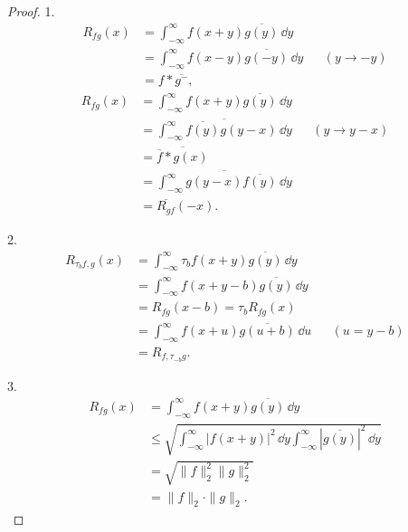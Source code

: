 \begin{proof}
    1.
    \begin{align}
        R_{fg}(x) & =\int_{-\infty}^{\infty}f(x+y)\overline{g(y)}\,\dd y\nonumber              \\
                  & =\int_{-\infty}^{\infty}f(x-y)\overline{g(-y)}\,\dd y && (y\to -y)\nonumber \\
                  & =f*\overline{g^-},
    \end{align}
    \begin{align}
        R_{fg}(x) & =\int_{-\infty}^{\infty}f(x+y)\overline{g(y)}\,\dd y\nonumber                         \\
                  & =\overline{\int_{-\infty}^{\infty}\overline{f(y)}g(y-x)\,\dd y} && (y\to y-x)\nonumber \\
                  & =\overline{\overline{f}*g(x)}\nonumber                                             \\
                  & =\overline{\int_{-\infty}^{\infty}g(y-x)\overline{f(y)}\,\dd y}\nonumber              \\
                  & =\overline{R_{gf}}(-x).
    \end{align}

    2.
    \begin{align}
        R_{\tau_b f,g}(x) & =\int_{-\infty}^{\infty}\tau_b f(x+y)\overline{g(y)}\,\dd y\nonumber           \\
                          & =\int_{-\infty}^{\infty}f(x+y-b)\overline{g(y)}\,\dd y\nonumber                \\
                          & =R_{fg}(x-b)=\tau_{b} R_{fg}(x)\nonumber                                    \\
                          & =\int_{-\infty}^{\infty}f(x+u)\overline{g(u+b)}\,\dd u      && (u=y-b)\nonumber \\
                          & =R_{f,\tau_{-b}g}.
    \end{align}

    3.
    \begin{align}
        R_{fg}(x) & =\int_{-\infty}^{\infty}f(x+y)\overline{g(y)}\,\dd y\nonumber                                                            \\
                  & \leq \sqrt{\int_{-\infty}^{\infty}|f(x+y)|^2\,\dd y\int_{-\infty}^{\infty}|\overline{g(y)}|^2\,\dd y}\nonumber \\
                  & =\sqrt{\|f\|_2^2\|g\|_2^2}\nonumber                                                                                   \\
                  & =\|f\|_2\cdot\|g\|_2.
    \end{align}
\end{proof}


